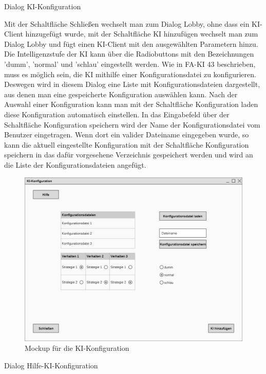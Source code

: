 Dialog \glqq{}KI-Konfiguration\grqq{}

Mit der Schaltfläche \glqq{}Schließen\grqq{} wechselt man zum Dialog \glqq{}Lobby\grqq{}, ohne dass ein KI-Client hinzugefügt wurde, mit der Schaltfläche \glqq{}KI hinzufügen\grqq{} wechselt man zum Dialog \glqq{}Lobby\grqq{} und fügt einen KI-Client mit den ausgewählten Parametern hinzu.
Die Intelligenzstufe der KI kann über die Radiobuttons mit den Bezeichnungen 'dumm', 'normal' und 'schlau' eingestellt werden.
Wie in FA-KI 43 beschrieben, muss es möglich sein, die KI mithilfe einer Konfigurationsdatei zu konfigurieren. Deswegen wird in diesem Dialog eine Liste mit Konfigurationsdateien dargestellt, aus denen man eine gespeicherte Konfiguration auswählen kann. Nach der Auswahl einer Konfiguration kann man mit der Schaltfläche \glqq{}Konfiguration laden\grqq{} diese Konfiguration automatisch einstellen.
In das Eingabefeld über der Schaltfläche \glqq{}Konfiguration speichern\grqq{} wird der Name der Konfigurationsdatei vom Benutzer eingetragen. Wenn dort ein valider Dateiname eingegeben wurde, so kann die aktuell eingestellte Konfiguration mit der Schaltfläche \glqq{}Konfiguration speichern\grqq{} in das dafür vorgesehene Verzeichnis gespeichert werden und wird an die Liste der Konfigurationsdateien angefügt.

\begin{figure}[H]
  \centering
  \includegraphics[width=\textwidth]{Meilenstein03/KI-Konfiguration_Mockup.png}
  \caption{Mockup für die KI-Konfiguration}
\end{figure}

Dialog \glqq{}Hilfe-KI-Konfiguration\grqq{}

